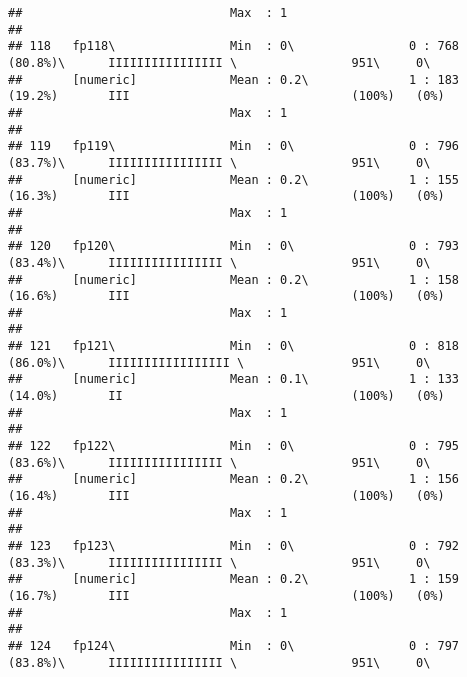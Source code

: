 \documentclass[]{article}
\begin{document}
\begin{verbatim}
##                             Max  : 1                                                                                           
## 
## 118   fp118\                Min  : 0\                0 : 768 (80.8%)\      IIIIIIIIIIIIIIII \                951\     0\       
##       [numeric]             Mean : 0.2\              1 : 183 (19.2%)       III                               (100%)   (0%)     
##                             Max  : 1                                                                                           
## 
## 119   fp119\                Min  : 0\                0 : 796 (83.7%)\      IIIIIIIIIIIIIIII \                951\     0\       
##       [numeric]             Mean : 0.2\              1 : 155 (16.3%)       III                               (100%)   (0%)     
##                             Max  : 1                                                                                           
## 
## 120   fp120\                Min  : 0\                0 : 793 (83.4%)\      IIIIIIIIIIIIIIII \                951\     0\       
##       [numeric]             Mean : 0.2\              1 : 158 (16.6%)       III                               (100%)   (0%)     
##                             Max  : 1                                                                                           
## 
## 121   fp121\                Min  : 0\                0 : 818 (86.0%)\      IIIIIIIIIIIIIIIII \               951\     0\       
##       [numeric]             Mean : 0.1\              1 : 133 (14.0%)       II                                (100%)   (0%)     
##                             Max  : 1                                                                                           
## 
## 122   fp122\                Min  : 0\                0 : 795 (83.6%)\      IIIIIIIIIIIIIIII \                951\     0\       
##       [numeric]             Mean : 0.2\              1 : 156 (16.4%)       III                               (100%)   (0%)     
##                             Max  : 1                                                                                           
## 
## 123   fp123\                Min  : 0\                0 : 792 (83.3%)\      IIIIIIIIIIIIIIII \                951\     0\       
##       [numeric]             Mean : 0.2\              1 : 159 (16.7%)       III                               (100%)   (0%)     
##                             Max  : 1                                                                                           
## 
## 124   fp124\                Min  : 0\                0 : 797 (83.8%)\      IIIIIIIIIIIIIIII \                951\     0\       

\end{verbatim}
\end{document}
